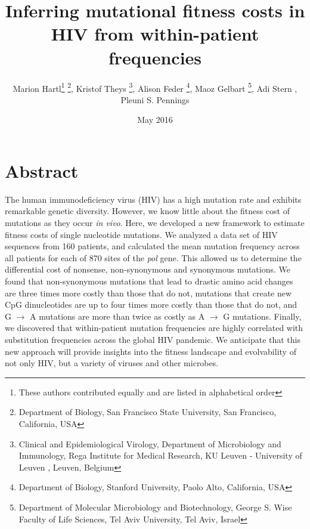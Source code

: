 \documentclass{article}
\title{Inferring mutational fitness costs in HIV from within-patient frequencies}
\author{Marion Hartl\footnote{These authors contributed equally and are listed in alphabetical order} \footnote{Department of Biology, San Francisco State University, San Francisco, California, USA}, Kristof Theys \footnotemark[1] \footnote{Clinical and Epidemiological Virology, Department of Microbiology and Immunology, Rega Institute for Medical Research, KU Leuven - University of Leuven , Leuven, Belgium}, 
Alison Feder \footnote{Department of Biology, Stanford University, Paolo Alto, California, USA}, Maoz Gelbart \footnote{Department of Molecular Microbiology and Biotechnology, George S. Wise Faculty of Life Sciences, Tel Aviv University, Tel Aviv, Israel}, Adi Stern \footnotemark[5], Pleuni S. Pennings \footnotemark[2]}
\date{May 2016}
\begin{document}
\maketitle{}
\section{Abstract}
The human immunodeficiency virus (HIV) has a high mutation rate and 
exhibits remarkable genetic diversity. However, we know little about the fitness cost of mutations as they occur \textit {in vivo}. Here, we developed a new framework to estimate fitness costs of single nucleotide mutations. We analyzed a data set of HIV sequences from 160 patients, and calculated the mean mutation frequency across all patients for each of 870 sites of the \textit{pol} gene. 
This allowed us to determine the differential cost of nonsense, non-synonymous and synonymous mutations. We found that non-synonymous mutations that lead to drastic amino acid changes are three times more costly than those that do not, mutations that create new CpG dinucleotides are up to four times more costly than those that do not, and G $\rightarrow$ A mutations are more than twice as costly as A $\rightarrow$ G mutations. Finally, we discovered that  within-patient mutation frequencies are highly correlated with substitution frequencies across the global HIV pandemic. We anticipate that this new approach will provide insights into the fitness landscape and evolvability of not only HIV, but a variety of viruses and other microbes. 

\end{document}

